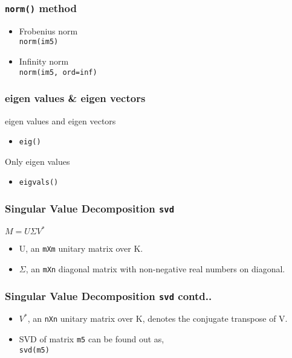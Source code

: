 \documentclass[17pt,compress]{beamer}
\begin{document}
\begin{frame}[fragile]
\frametitle{\texttt{norm()} method}
\label{sec-8}


\begin{itemize}
\item Frobenius norm\\
     \texttt{norm(im5)}\pause
\item Infinity norm\\
     \texttt{norm(im5, ord=inf)}
\end{itemize}
\end{frame}
\begin{frame}
\frametitle{eigen values \& eigen vectors}
\label{sec-9}

  eigen values and eigen vectors

\begin{itemize}
\item \texttt{eig()}\pause
\end{itemize}
 
  Only eigen values

\begin{itemize}
\item \texttt{eigvals()}
\end{itemize}
\end{frame}
\begin{frame}[fragile]
\frametitle{Singular Value Decomposition \texttt{svd}}
\label{sec-10.1}
   {\small  $M = U \Sigma V^*$}\pause
\begin{itemize}
\item U, an \texttt{mXm} unitary matrix over K.\pause
\item $\Sigma$, 
		 an \texttt{mXn} diagonal matrix with non-negative real numbers on diagonal.
\end{itemize}
\end{frame}
\begin{frame}[fragile]
\frametitle{Singular Value Decomposition \texttt{svd} contd..}
\label{sec-10.2}
 
\begin{itemize}

\item $V^*$,
         an \texttt{nXn} unitary matrix over K, denotes the conjugate transpose of V.\pause
\item SVD of matrix \texttt{m5} can be found out as, \\ \texttt{svd(m5)}
\end{itemize}

\end{frame}
\end{document}

